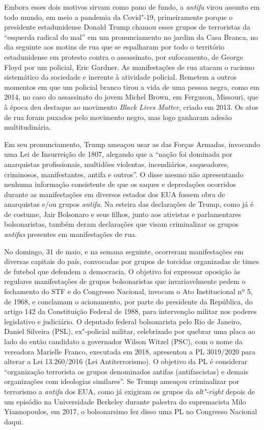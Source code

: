 Embora esses dois motivos sirvam como pano de fundo, a \emph{antifa}
virou assunto em todo mundo, em meio a pandemia da Covid"-19,
primeiramente porque o presidente estadunidense Donald Trump chamou
esses grupos de terroristas da ``esquerda radical do mal'' em um
pronunciamento no jardim da Casa Branca, no dia seguinte aos motins de
rua que se espalharam por todo o território estadunidense em protesto
contra o assassinato, por sufocamento, de George Floyd por um policial,
Eric Gardner. As manifestações de rua atacam o racismo sistemático da
sociedade e inerente à atividade policial. Remetem a outros momentos em
que um policial branco tirou a vida de uma pessoa negra, como em 2014,
no caso do assassinato do jovem Michel Brown, em Ferguson, Missouri, que
à época deu destaque ao movimento \emph{Black Lives Matter}, criado em
2013. Os atos de rua foram puxados pelo movimento negro, mas logo
ganharam adesão multitudinária.

Em seu pronunciamento, Trump ameaçou usar as das Forças Armadas,
invocando uma Lei de Insurreição de 1807, alegando que a ``nação foi
dominada por anarquistas profissionais, multidões violentas,
incendiários, saqueadores, criminosos, manifestantes, antifa e outros''.
O disse mesmo não apresentando nenhuma informação consistente de que os
saques e depredações ocorridos durante as manifestações em diversos
estados dos EUA fossem obra de anarquistas e/ou grupos \emph{antifa}. Na
esteira das declarações de Trump, como já é de costume, Jair Bolsonaro e
seus filhos, junto aos ativistas e parlamentares bolsonaristas, também
deram declarações que visam criminalizar os grupos \emph{antifas}
presentes em manifestações de rua.

No domingo, 31 de maio, e na semana seguinte, ocorreram manifestações em
diversas capitais do país, convocadas por grupos de torcidas organizadas
de times de futebol que defendem a democracia. O objetivo foi expressar
oposição às regulares manifestações de grupos bolsonaristas que
invariavelmente pedem o fechamento do STF e do Congresso Nacional,
invocam o Ato Institucional nº 5, de 1968, e conclamam o acionamento,
por parte do presidente da República, do artigo 142 da Constituição
Federal de 1988, para intervenção militar nos poderes legislativo e
judiciário. O deputado federal bolsonarista pelo Rio de Janeiro, Daniel
Silveira (PSL), ex"-policial militar, celebrizado por quebrar uma placa
ao lado do então candidato a governador Wilson Witzel (PSC), com o nome
da vereadora Marielle Franco, executada em 2018, apresentou a PL
3019/2020 para alterar a Lei 13.260/2016 (Lei Antiterrorismo). O
objetivo da PL é considerar ``organização terrorista os grupos
denominados antifas (antifascistas) e demais organizações com ideologias
similares''. Se Trump ameaçou criminalizar por terrorismo a
\emph{antifa} dos EUA, como já exigiram os grupos da \emph{alt"-right}
depois de um episódio na Universidade Berkeley durante palestra do
supremacista Milo Yiannopoulos, em 2017, o bolsonarsimo fez disso uma PL
no Congresso Nacional daqui.

